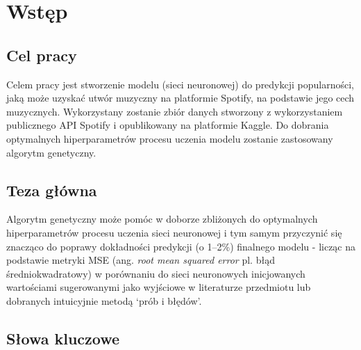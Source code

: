 \documentclass[a4paper,12pt]{article}
\numberwithin{figure}{section}
\begin{document}
    \newpage

    \maketitle

    \tableofcontents

    \newpage


    \section{Wstęp}

    \subsection{Cel pracy}

    Celem pracy jest stworzenie modelu (sieci neuronowej) do predykcji popularności, jaką może uzyskać utwór muzyczny na platformie Spotify, na podstawie jego cech muzycznych. Wykorzystany zostanie zbiór danych stworzony z wykorzystaniem publicznego API Spotify i opublikowany na platformie Kaggle. Do dobrania optymalnych hiperparametrów procesu uczenia modelu zostanie zastosowany algorytm genetyczny.

    \subsection{Teza główna}

    Algorytm genetyczny może pomóc w doborze zbliżonych do optymalnych hiperparametrów procesu uczenia sieci neuronowej i tym samym przyczynić się znacząco do poprawy dokładności predykcji (o 1--2\%) finalnego modelu - licząc na podstawie metryki MSE (ang. \textit{root mean squared error} pl. błąd średniokwadratowy) w porównaniu do sieci neuronowych inicjowanych wartościami sugerowanymi jako wyjściowe w literaturze przedmiotu lub dobranych intuicyjnie metodą `prób i błędów'.

    \subsection{Słowa kluczowe}
\end{document}
